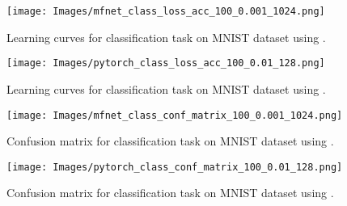 \begin{figure}[ht]
    \centering
    \texttt{[image: Images/mfnet\_class\_loss\_acc\_100\_0.001\_1024.png]}
    \caption{Learning curves for classification task on MNIST dataset using \mfnet.}
    \label{fig:class_mfnet}
\end{figure}

\begin{figure}[hb]
    \centering
    \texttt{[image: Images/pytorch\_class\_loss\_acc\_100\_0.01\_128.png]}
    \caption{Learning curves for classification task on MNIST dataset using \pytorch.}
    \label{fig:class_pytorch}
\end{figure}

\begin{figure}[ht]
    \centering
    \texttt{[image: Images/mfnet\_class\_conf\_matrix\_100\_0.001\_1024.png]}
    \caption{Confusion matrix for classification task on MNIST dataset using \mfnet.}
    \label{fig:conf_mfnet}
\end{figure}

\begin{figure}[hb]
    \centering
    \texttt{[image: Images/pytorch\_class\_conf\_matrix\_100\_0.01\_128.png]}
    \caption{Confusion matrix for classification task on MNIST dataset using \pytorch.}
    \label{fig:conf_pytorch}
\end{figure}
